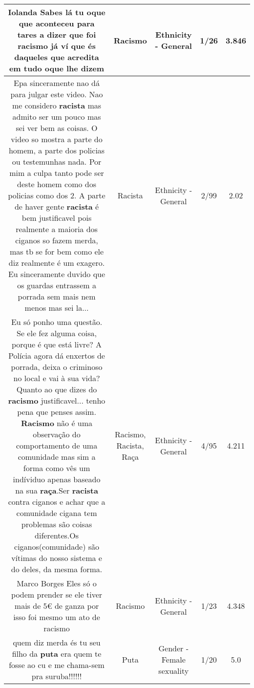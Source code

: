 \documentclass[11pt]{article}
\newlength\mylength
\begin{document}
\begin{center}
\begin{longtable}{|C{.65\mylength}|C{.30\mylength}|C{.12\mylength}|C{.12\mylength}|C{.12\mylength}|}
  \small Iolanda Sabes lá tu oque que aconteceu para tares a dizer que foi \textbf{racismo} já ví que és daqueles que acredita em tudo oque lhe dizem\normalsize   & Racismo & Ethnicity - General & 1/26 & 3.846 \\  \hline
  \small Epa sinceramente nao dá para julgar este video. Nao me considero \textbf{racista} mas admito ser um pouco mas sei ver bem as coisas. O video so mostra a parte do homem, a parte dos policias ou testemunhas nada. Por mim a culpa tanto pode ser deste homem como dos policias como dos 2.  A parte de haver gente \textbf{racista} é bem justificavel pois realmente a maioria dos ciganos so fazem merda, mas tb se for bem como ele diz realmente é um exagero. Eu sinceramente duvido que os guardas entrassem a porrada sem mais nem menos mas sei la...\normalsize   & Racista & Ethnicity - General & 2/99 & 2.02 \\  \hline
  \small Eu só ponho uma questão. Se ele fez alguma coisa, porque é que está livre? A Polícia agora dá enxertos de porrada, deixa o criminoso no local e vai à sua vida?Quanto ao que dizes do \textbf{racismo} justificavel... tenho pena que penses assim. \textbf{Racismo} não é uma observação do comportamento de uma comunidade mas sim a forma como vês um indíviduo apenas baseado na sua \textbf{raça}.Ser \textbf{racista} contra ciganos e achar que a comunidade cigana tem problemas são coisas diferentes.Os ciganos(comunidade) são vítimas do nosso sistema e do deles, da mesma forma.\normalsize   & Racismo, Racista, Raça & Ethnicity - General & 4/95 & 4.211 \\  \hline
  \small Marco Borges Eles só o podem prender se ele tiver mais de 5€ de ganza por isso foi mesmo um ato de racismo\normalsize   & Racismo & Ethnicity - General & 1/23 & 4.348 \\  \hline
  \small quem diz merda és tu seu filho da \textbf{puta} era quem te fosse ao cu e me chama-sem pra suruba!!!!!!\normalsize   & Puta & Gender - Female sexuality & 1/20 & 5.0 \\  \hline

\end{longtable}
\end{center}
\end{document}
